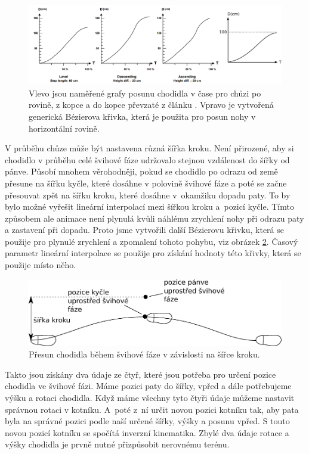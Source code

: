 \begin{figure}[h]
	\centering
	\includegraphics[width=1.0\linewidth]{fig/leg_swing_speed.pdf}
	\caption{Vlevo jsou naměřené grafy posunu chodidla v čase pro chůzi po rovině, z kopce a do kopce převzaté z článku \cite{chung}. Vpravo je vytvořená generická Bézierova křivka, která je použita pro posun nohy v horizontální rovině.}
	\label{fig:swingSpeed}
\end{figure}

V průběhu chůze může být nastavena různá šířka kroku. Není přirozené, aby si chodidlo v průběhu celé švihové fáze udržovalo stejnou vzdálenost do šířky od pánve. Působí mnohem věrohodněji, pokud se chodidlo po odrazu od země přesune na šířku kyčle, které dosáhne v polovině švihové fáze a poté se začne přesouvat zpět na šířku kroku, které dosáhne v~okamžiku dopadu paty. To by bylo možné vyřešit lineární interpolací mezi šířkou kroku a~pozicí kyčle. Tímto způsobem ale animace není plynulá kvůli náhlému zrychlení nohy při odrazu paty a zastavení při dopadu. Proto jsme vytvořili další Bézierovu křivku, která se použije pro plynulé zrychlení a zpomalení tohoto pohybu, viz obrázek \ref{fig:widthStep}. Časový parametr lineární interpolace se použije pro získání hodnoty této křivky, která se použije místo něho.

\begin{figure}[h]
	\centering
	\includegraphics[width=0.7\linewidth]{fig/svih_sirka_kroku.pdf}
	\caption{Přesun chodidla během švihové fáze v závislosti na šířce kroku.}
	\label{fig:widthStep}
\end{figure}

Takto jsou získány dva údaje ze čtyř, které jsou potřeba pro určení pozice chodidla ve švihové fázi. Máme pozici paty do šířky, vpřed a dále potřebujeme výšku a rotaci chodidla. Když máme všechny tyto čtyři údaje můžeme nastavit správnou rotaci v kotníku. A~poté z~ní určit novou pozici kotníku tak, aby pata byla na správné pozici podle naší určené šířky, výšky a posunu vpřed. S touto novou pozicí kotníku se spočítá inverzní kinematika. Zbylé dva údaje rotace a výšky chodidla je prvně nutné přizpůsobit nerovnému terénu.

